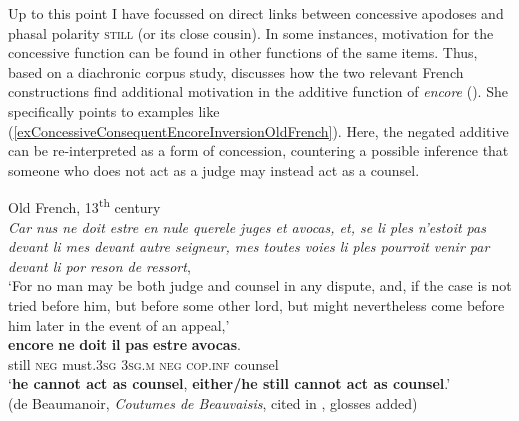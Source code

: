  Up to this point I have focussed on direct links between concessive apodoses and phasal polarity \textsc{still} (or its close  cousin). In some instances, motivation for the concessive function can be found in other functions of the same items. Thus, based on a diachronic corpus study, \textcite[197–199]{MosegaardHansen2008} discusses how the two relevant French constructions find additional motivation in the additive function of \textit{encore} (). She specifically points to examples like (\ref{exConcessiveConsequentEncoreInversionOldFrench}). Here, the negated additive can be re-interpreted as a form of concession, countering a possible inference that someone who does not act as a judge may instead act as a counsel.

\begin{exe}
	\ex Old French, 13\textsuperscript{th} century\label{exConcessiveConsequentEncoreInversionOldFrench}\\
	\textit{Car nus ne doit estre en nule querele juges et avocas, et, se li ples n’estoit pas devant li mes devant autre seigneur, mes toutes voies li ples pourroit venir par devant li por reson de ressort},\\
	\lq For no man may be both judge and counsel in any dispute, and, if the case is not tried before him, but before some other lord, but might nevertheless come before him later in the event of an appeal,\rq{}\\
	\gll \textbf{encore} \textbf{ne} \textbf{doit} \textbf{il} \textbf{pas} \textbf{estre} \textbf{avocas}.\\
	still \textsc{neg} must.3\textsc{sg} 3\textsc{sg}.\textsc{m} \textsc{neg} \textsc{cop}.\textsc{inf} counsel\\
	\glt\lq\textbf{he cannot act as counsel}, \textbf{either}\textbf{/}\textbf{he still cannot act as counsel}.\rq{}\\
(de Beaumanoir, \textit{Coutumes de Beauvaisis}, cited in \cite[197–198]{MosegaardHansen2008}, glosses added)
\end{exe}

